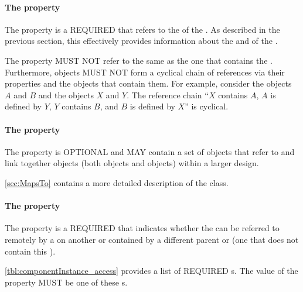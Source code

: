 \paragraph{The  property}
\label{sec:instanceOf}

The  property is a REQUIRED  that refers to the  of the .
As described in the previous section, this  effectively provides information about the  and  of the .

The  property MUST NOT refer to the same  as the one that contains the .
Furthermore,  objects MUST NOT form a cyclical chain of references via their  properties and the  objects that contain them.
For example, consider the  objects $A$ and $B$ and the  objects $X$ and $Y$. The reference chain ``$X$ contains $A$, $A$ is defined by $Y$, $Y$ contains $B$, and $B$ is defined by $X$'' is cyclical.

\paragraph{The  property}\label{sec:mapsTos:CI}

The  property is OPTIONAL and MAY contain a set of  objects that refer to and link together  objects (both  objects and  objects) within a larger design.

\ref{sec:MapsTo} contains a more detailed description of the  class.

\paragraph{The  property}
\label{sec:access}
\label{sec:public}
\label{sec:private}

The  property is a REQUIRED  that indicates whether the 
can be referred to remotely by a  on another  or  contained by a different parent  or  (one that does not contain this ).

\ref{tbl:componentInstance_access} provides a list of REQUIRED  s. The value of the  property MUST be one of these s.

